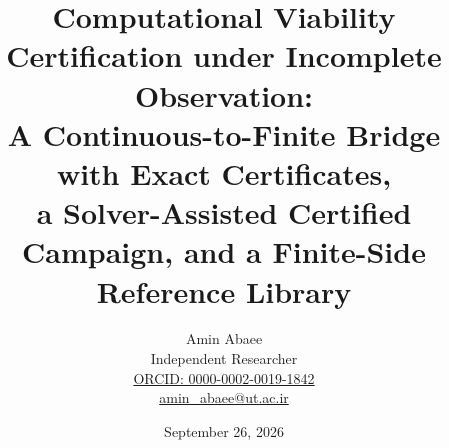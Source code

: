 \documentclass[10pt,twocolumn]{article}
\theoremstyle{plain}
\theoremstyle{definition}
\theoremstyle{remark}
\begin{document}
\title{Computational Viability Certification under Incomplete Observation:\\
A Continuous-to-Finite Bridge with Exact Certificates,\\
a Solver-Assisted Certified Campaign, and a Finite-Side Reference Library}
\author{Amin Abaee\\[0.35em]
{\small Independent Researcher}\\[0.55em]
{\small\href{https://orcid.org/0000-0002-0019-1842}{ORCID: 0000-0002-0019-1842}}\\[0.3em]
{\small\href{mailto:amin\_abaee@ut.ac.ir}{amin\_abaee@ut.ac.ir}}}
\date{September 26, 2026}
\maketitle
\end{document}

